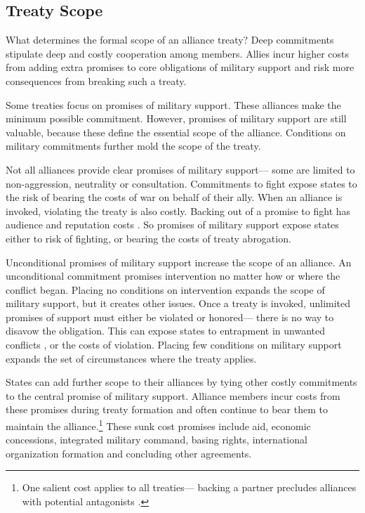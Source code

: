 \documentclass[12pt]{article}
\begin{document}
\subsection{Treaty Scope}


What determines the formal scope of an alliance treaty? 
Deep commitments stipulate deep and costly cooperation among members.
Allies incur higher costs from adding extra promises to core obligations of military support and risk more consequences from breaking such a treaty. 


Some treaties focus on promises of military support. 
These alliances make the minimum possible commitment. 
However, promises of military support are still valuable, because these define the essential scope of the alliance.  
Conditions on military commitments further mold the scope of the treaty. 


Not all alliances provide clear promises of military support--- some are limited to non-aggression, neutrality or consultation. 
Commitments to fight expose states to the risk of bearing the costs of war on behalf of their ally. 
When an alliance is invoked, violating the treaty is also costly. 
Backing out of a promise to fight has audience \citep{Levyetal2015} and reputation costs \citep{Gibler2008, Crescenzietal2012, Mattes2012}. 
So promises of military support expose states either to risk of fighting, or bearing the costs of treaty abrogation. 


Unconditional promises of military support increase the scope of an alliance. 
An unconditional commitment promises intervention no matter how or where the conflict began. 
Placing no conditions on intervention expands the scope of military support, but it creates other issues. 
Once a treaty is invoked, unlimited promises of support must either be violated or honored--- there is no way to disavow the obligation. 
This can expose states to entrapment in unwanted conflicts \citep{Snyder1990, Benson2012}, or the costs of violation. 
Placing few conditions on military support expands the set of circumstances where the treaty applies.  


States can add further scope to their alliances by tying other costly commitments to the central promise of military support. 
Alliance members incur costs from these promises during treaty formation and often continue to bear them to maintain the alliance.\footnote{
One salient cost applies to all treaties--- backing a partner precludes alliances with potential antagonists \citep{Snyder1997}.} 
These sunk cost promises include aid, economic concessions, integrated military command, basing rights, international organization formation and concluding other agreements. 
\end{document}
